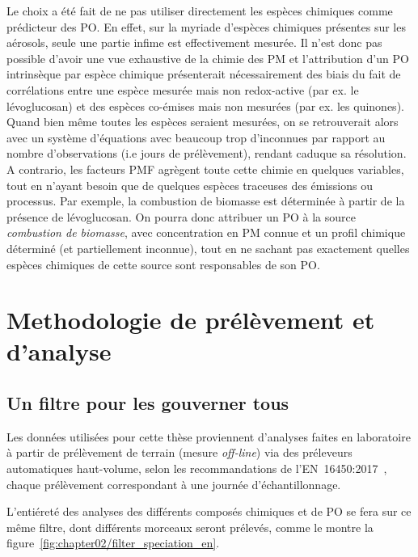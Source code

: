 Le choix a été fait de ne pas utiliser directement les espèces chimiques comme prédicteur
des PO. En effet, sur la myriade d'espèces chimiques présentes sur les aérosols, seule une
partie infime est effectivement mesurée. Il n'est donc pas possible d'avoir une vue
exhaustive de la chimie des PM et l'attribution d'un PO intrinsèque par espèce chimique
présenterait nécessairement des biais du fait de corrélations entre une espèce mesurée mais
non redox-active (par ex. le lévoglucosan) et des espèces co-émises mais non mesurées (par ex. les
quinones). Quand bien même toutes les espèces seraient mesurées, on se retrouverait alors
avec un système d'équations avec beaucoup trop d'inconnues par rapport au nombre
d'observations (i.e jours de prélèvement), rendant caduque sa résolution.
A contrario, les facteurs PMF agrègent toute cette chimie en quelques variables, tout en
n'ayant besoin que de quelques espèces traceuses des émissions ou processus. Par exemple,
la combustion de biomasse est déterminée à partir de la présence de lévoglucosan. On pourra
donc attribuer un PO à la source \textit{combustion de biomasse}, avec concentration en PM
connue et un profil chimique déterminé (et partiellement inconnue), tout en ne sachant
pas exactement quelles espèces chimiques de cette source sont responsables de son PO.



\section{Methodologie de prélèvement et d'analyse}%
\label{sec:methodologie_de_prélèvement_et_d_analyse}


\subsection{Un filtre pour les gouverner tous}%
\label{sub:un_filtre_pour_les_gouverner_tous}

Les données utilisées pour cette thèse proviennent d'analyses faites en laboratoire à
partir de prélèvement de terrain (mesure \textit{off-line}) via des préleveurs
automatiques haut-volume, selon les recommandations de
l'EN~16450:2017~\autocite{cenAmbient2017a}, chaque prélèvement correspondant à une
journée d'échantillonnage. 

L'entiéreté des analyses des différents composés chimiques et de PO se fera sur ce même
filtre, dont différents morceaux seront prélevés, comme le montre la
figure~\ref{fig:chapter02/filter_speciation_en}.

